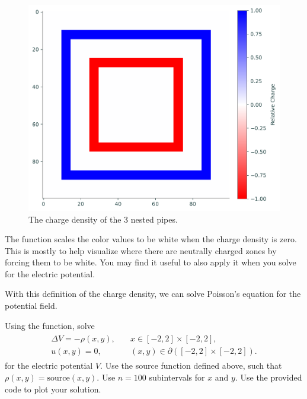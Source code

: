 \begin{figure}
\includegraphics[scale=0.7]{figures/relative_charge.pdf}
\caption{The charge density of the 3 nested pipes.}
\end{figure}


The function  scales the color values to be white when the charge density is zero.
This is mostly to help visualize where there are neutrally charged zones by forcing them to be white.
You may find it useful to also apply it when you solve for the electric  potential.

With this definition of the charge density, we can solve Poisson's equation for the potential field.

\begin{problem}
Using the  function, solve 
\begin{align}
	\begin{split}
	\Delta V = -\rho(x,y), &{}\quad x \in [-2,2]\times [-2,2],\\
	u(x,y) = 0, &{}\quad (x,y) \in \partial ([-2,2]\times [-2,2]).
	\end{split}
	\label{poisson2d:source}
\end{align}
% 
for the electric potential $V.$
Use the source function defined above, such that $\rho(x,y) = \text{source}(x,y)$. Use $n=100$ subintervals for $x$ and $y$. Use the provided code to plot your solution.
\end{problem}

